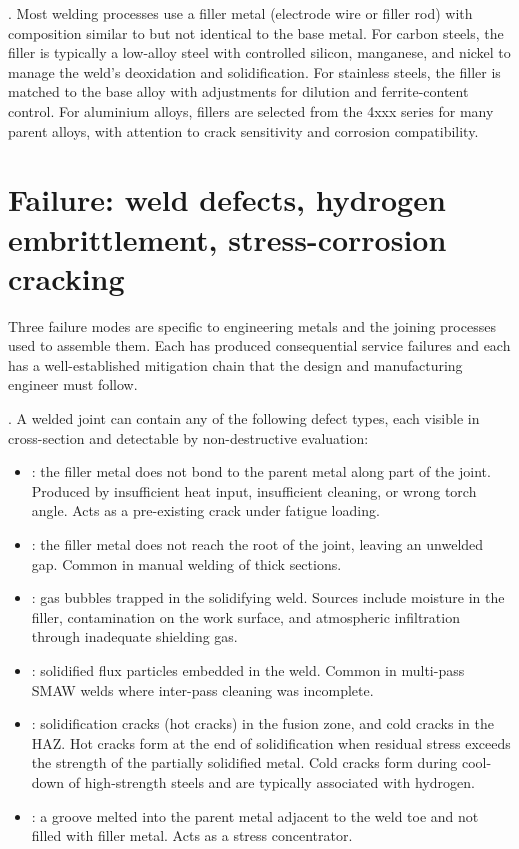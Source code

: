. Most welding processes use a filler metal
(electrode wire or filler rod) with composition similar to but not
identical to the base metal. For carbon steels, the filler is
typically a low-alloy steel with controlled silicon, manganese, and
nickel to manage the weld's deoxidation and solidification. For
stainless steels, the filler is matched to the base alloy with
adjustments for dilution and ferrite-content control. For aluminium
alloys, fillers are selected from the 4xxx series for many parent
alloys, with attention to crack sensitivity and corrosion
compatibility.

\section{Failure: weld defects, hydrogen embrittlement, stress-corrosion cracking}

Three failure modes are specific to engineering metals and the
joining processes used to assemble them. Each has produced consequential
service failures and each has a well-established mitigation chain that
the design and manufacturing engineer must follow.

. A welded joint can contain any of the
following defect types, each visible in cross-section and detectable
by non-destructive evaluation:

\begin{itemize}[leftmargin=*]
\item {}: the filler metal does not bond to
  the parent metal along part of the joint. Produced by insufficient
  heat input, insufficient cleaning, or wrong torch angle. Acts as
  a pre-existing crack under fatigue loading.
\item {}: the filler metal does not reach
  the root of the joint, leaving an unwelded gap. Common in
  manual welding of thick sections.
\item {}: gas bubbles trapped in the solidifying
  weld. Sources include moisture in the filler, contamination on
  the work surface, and atmospheric infiltration through inadequate
  shielding gas.
\item {}: solidified flux particles embedded
  in the weld. Common in multi-pass SMAW welds where inter-pass
  cleaning was incomplete.
\item {}: solidification cracks (hot cracks) in the
  fusion zone, and cold cracks in the HAZ. Hot cracks form at the
  end of solidification when residual stress exceeds the strength of
  the partially solidified metal. Cold cracks form during cool-down
  of high-strength steels and are typically associated with hydrogen.
\item {}: a groove melted into the parent metal
  adjacent to the weld toe and not filled with filler metal. Acts as
  a stress concentrator.
\end{itemize}


